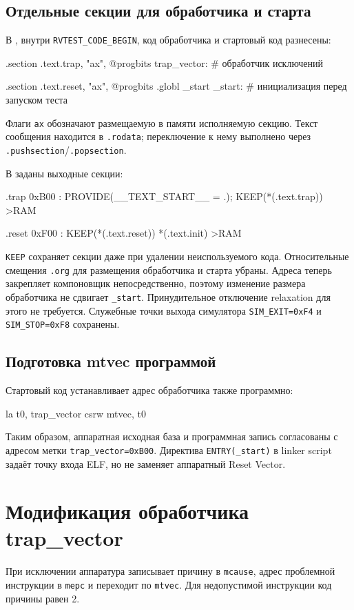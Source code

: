 \documentclass[12pt,a4paper]{article}
\begin{document}
\subsection{Отдельные секции для обработчика и старта}
В , внутри \texttt{RVTEST\_CODE\_BEGIN},
код обработчика и стартовый код разнесены:
\begin{Code}
.section .text.trap, "ax", @progbits
trap_vector:
    # обработчик исключений

.section .text.reset, "ax", @progbits
.globl _start
_start:
    # инициализация перед запуском теста
\end{Code}
Флаги \texttt{ax} обозначают размещаемую в памяти исполняемую секцию.
Текст сообщения находится в \texttt{.rodata}; переключение к нему выполнено
через \texttt{.pushsection}/\texttt{.popsection}.

В  заданы выходные секции:
\begin{Code}
.trap 0xB00 : {
    PROVIDE(__TEXT_START__ = .);
    KEEP(*(.text.trap))
} >RAM

.reset 0xF00 : {
    KEEP(*(.text.reset))
    *(.text.init)
} >RAM
\end{Code}
\texttt{KEEP} сохраняет секции даже при удалении неиспользуемого кода.
Относительные смещения \texttt{.org} для размещения обработчика и старта
убраны. Адреса теперь закрепляет компоновщик непосредственно, поэтому
изменение размера обработчика не сдвигает \texttt{\_start}.
Принудительное отключение relaxation для этого не требуется.
Служебные точки выхода симулятора \texttt{SIM\_EXIT=0xF4} и
\texttt{SIM\_STOP=0xF8} сохранены.

\subsection{Подготовка mtvec программой}
Стартовый код устанавливает адрес обработчика также программно:
\begin{Code}
la t0, trap_vector
csrw mtvec, t0
\end{Code}
Таким образом, аппаратная исходная база и программная запись согласованы
с адресом метки \texttt{trap\_vector=0xB00}. Директива \texttt{ENTRY(\_start)}
в linker script задаёт точку входа ELF, но не заменяет аппаратный Reset Vector.

\section{Модификация обработчика trap\_vector}
При исключении аппаратура записывает причину в \texttt{mcause}, адрес
проблемной инструкции в \texttt{mepc} и переходит по \texttt{mtvec}.
Для недопустимой инструкции код причины равен 2.
\end{document}

